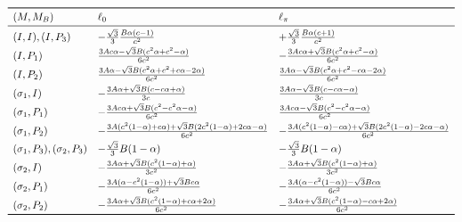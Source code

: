 \documentclass[11pt]{amsart}
\theoremstyle{definition}
\theoremstyle{remark}
\begin{document}
{\small
\[
\begin{array}{lll}
\toprule
(M,M_B) & \ell_0 & \ell_\pi\\
\midrule
(I,I),(I,P_3) & -\frac{\sqrt3}{3}\frac{B\alpha(c-1)}{c^2} & +\frac{\sqrt3}{3}\frac{B\alpha(c+1)}{c^2}\\[3pt]
(I,P_1) & \frac{3Ac\alpha-\sqrt3B(c^2\alpha+c^2-\alpha)}{6c^2} & -\frac{3Ac\alpha+\sqrt3B(c^2\alpha+c^2-\alpha)}{6c^2}\\[3pt]
(I,P_2) & \frac{3A\alpha-\sqrt3B(c^2\alpha+c^2+c\alpha-2\alpha)}{6c^2} & \frac{3A\alpha-\sqrt3B(c^2\alpha+c^2-c\alpha-2\alpha)}{6c^2}\\[3pt]
(\sigma_1,I) & -\frac{3A\alpha+\sqrt3B(c-c\alpha+\alpha)}{3c} & \frac{3A\alpha-\sqrt3B(c-c\alpha-\alpha)}{3c}\\[3pt]
(\sigma_1,P_1) & -\frac{3Ac\alpha+\sqrt3B(c^2-c^2\alpha-\alpha)}{6c^2} & \frac{3Ac\alpha-\sqrt3B(c^2-c^2\alpha-\alpha)}{6c^2}\\[3pt]
(\sigma_1,P_2) & -\frac{3A(c^2(1-\alpha)+c\alpha)+\sqrt3B(2c^2(1-\alpha)+2c\alpha-\alpha)}{6c^2} & -\frac{3A(c^2(1-\alpha)-c\alpha)+\sqrt3B(2c^2(1-\alpha)-2c\alpha-\alpha)}{6c^2}\\[3pt]
(\sigma_1,P_3),(\sigma_2,P_3) & -\frac{\sqrt3}{3}B(1-\alpha) & -\frac{\sqrt3}{3}B(1-\alpha)\\[3pt]
(\sigma_2,I) & -\frac{3A\alpha+\sqrt3B(c^2(1-\alpha)+\alpha)}{3c^2} & -\frac{3A\alpha+\sqrt3B(c^2(1-\alpha)+\alpha)}{3c^2}\\[3pt]
(\sigma_2,P_1) & -\frac{3A(\alpha-c^2(1-\alpha))+\sqrt3Bc\alpha}{6c^2} & -\frac{3A(\alpha-c^2(1-\alpha))-\sqrt3Bc\alpha}{6c^2}\\[3pt]
(\sigma_2,P_2) & -\frac{3A\alpha+\sqrt3B(c^2(1-\alpha)+c\alpha+2\alpha)}{6c^2} & -\frac{3A\alpha+\sqrt3B(c^2(1-\alpha)-c\alpha+2\alpha)}{6c^2}\\
\bottomrule
\end{array}
\]
}
\end{document}
